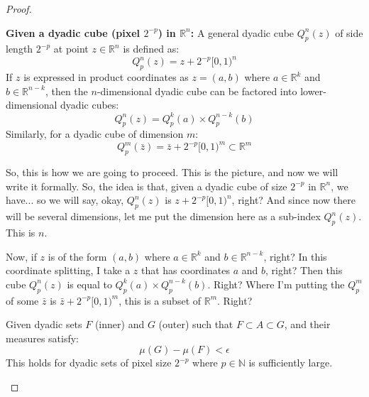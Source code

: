 \begin{proof}
\begin{math-stroke}
\textbf{Given a dyadic cube (pixel $2^{-p}$) in $\mathbb{R}^n$:}
A general dyadic cube $Q_p^n(z)$ of side length $2^{-p}$ at point $z \in \mathbb{R}^n$ is defined as:
\[
Q_p^n(z) = z + 2^{-p} [0,1)^n
\]
If $z$ is expressed in product coordinates as $z=(a,b)$ where $a \in \mathbb{R}^k$ and $b \in \mathbb{R}^{n-k}$, then the $n$-dimensional dyadic cube can be factored into lower-dimensional dyadic cubes:
\[
Q_p^n(z) = Q_p^k(a) \times Q_p^{n-k}(b)
\]
Similarly, for a dyadic cube of dimension $m$:
\[
Q_p^m(\bar{z}) = \bar{z} + 2^{-p} [0,1)^m \subset \mathbb{R}^m
\]
\end{math-stroke}

\begin{spoken-clean}[00:05:20 - 00:06:01]
So, this is how we are going to proceed. This is the picture, and now we will write it formally. So, the idea is that, given a dyadic cube of size $2^{-p}$ in $\mathbb{R}^n$, we have... so we will say, okay, $Q_p^n(z)$ is $z + 2^{-p}[0,1)^n$, right? And since now there will be several dimensions, let me put the dimension here as a sub-index $Q_p^n(z)$. This is $n$.
\end{spoken-clean}

\begin{spoken-clean}[00:06:01 - 00:06:57]
Now, if $z$ is of the form $(a,b)$ where $a \in \mathbb{R}^k$ and $b \in \mathbb{R}^{n-k}$, right? In this coordinate splitting, I take a $z$ that has coordinates $a$ and $b$, right? Then this cube $Q_p^n(z)$ is equal to $Q_p^k(a) \times Q_p^{n-k}(b)$. Right? Where I'm putting the $Q_p^m$ of some $\bar{z}$ is $\bar{z} + 2^{-p}[0,1)^m$, this is a subset of $\mathbb{R}^m$. Right?
\end{spoken-clean}

\begin{math-stroke}
Given dyadic sets $F$ (inner) and $G$ (outer) such that $F \subset A \subset G$, and their measures satisfy:
\[
\mu(G) - \mu(F) < \epsilon
\]
This holds for dyadic sets of pixel size $2^{-p}$ where $p \in \mathbb{N}$ is sufficiently large.
\end{math-stroke}


\end{proof}
